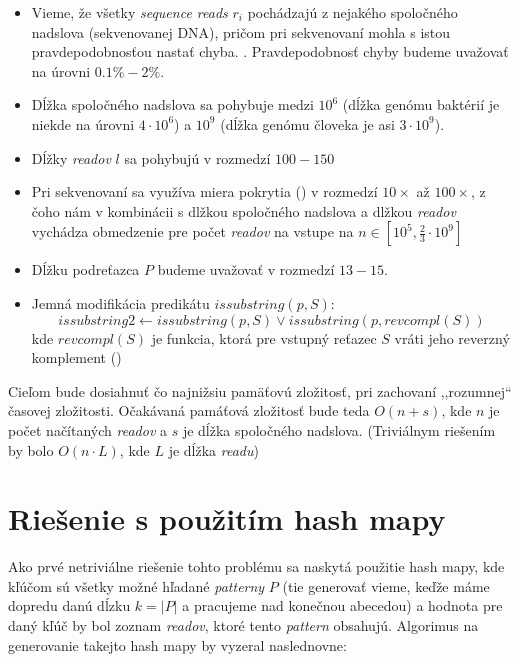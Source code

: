 \begin{itemize}
    \item Vieme, že všetky \emph{sequence reads} $r_i$ pochádzajú z nejakého
    spoločného nadslova (sekvenovanej DNA), pričom pri sekvenovaní mohla s
    istou pravdepodobnosťou nastať chyba. . Pravdepodobnosť chyby budeme uvažovať na úrovni $0.1\% - 2\% $.
    \item Dĺžka spoločného nadslova sa pohybuje medzi $10^6$ (dĺžka genómu
    baktérií je niekde na úrovni $4 \cdot 10^6$) a $10^9$ (dĺžka genómu človeka
    je asi $3 \cdot 10^9$).
    \item Dĺžky \emph{readov} $l$ sa pohybujú v rozmedzí $100 - 150$
    \item Pri sekvenovaní sa využíva miera pokrytia () v rozmedzí $10\times$ až $100\times$, z čoho nám v
    kombinácii s dlžkou spoločného nadslova a dlžkou \emph{readov} vychádza
    obmedzenie pre počet \emph{readov} na vstupe na 
    $n \in [ 10^5, \frac{2}{3} \cdot 10^9 ]$ 
    \item Dĺžku podreťazca $P$ budeme uvažovať v rozmedzí $13 -15$. 
    \item Jemná modifikácia predikátu $issubstring(p, S)$: $$issubstring2
    \leftarrow issubstring(p, S) \vee issubstring(p, revcompl(S))$$ kde
    $revcompl(S)$ je funkcia, ktorá pre vstupný reťazec $S$ vráti jeho reverzný
    komplement ()
\end{itemize}

Cieľom bude dosiahnuť čo najnižsiu pamäťovú zložitosť, pri zachovaní
,,rozumnej`` časovej zložitosti. Očakávaná pamáťová zložitosť bude teda $O(n +
s)$, kde $n$ je počet načítaných \emph{readov} a $s$ je dĺžka spoločného
nadslova. (Triviálnym riešením by bolo $O(n \cdot L)$, kde $L$ je dĺžka
\emph{readu})

\section{Riešenie s použitím hash mapy}
Ako prvé netriviálne riešenie tohto problému sa naskytá použitie hash mapy,
kde kľúčom sú všetky možné hľadané \emph{patterny} $P$ (tie generovať vieme,
keďže máme dopredu danú dĺzku $k = |P|$ a pracujeme nad konečnou abecedou) a
hodnota pre daný kľúč by bol zoznam \emph{readov}, ktoré tento \emph{pattern}
obsahujú. Algorimus na generovanie takejto hash mapy by vyzeral naslednovne:

